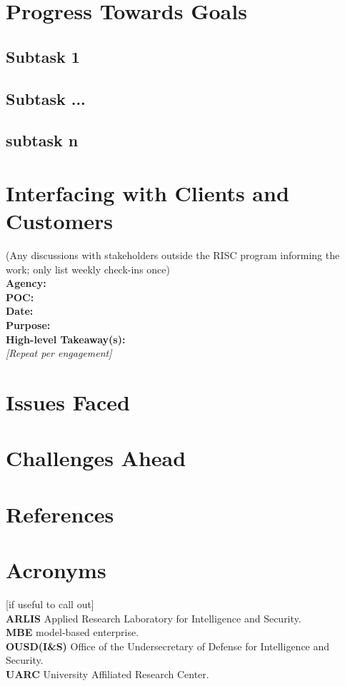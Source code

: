 \documentclass[letterpaper, 10pt]{article}
\begin{document}
\begin{multicols}{2}
    \section{Progress Towards Goals}
        \subsection{Subtask 1}
            \lipsum[5]
        \subsection{Subtask ...}
            \lipsum[6]
        \subsection{subtask n}
            \lipsum[7]
    \section{Interfacing with Clients and Customers}
        (Any discussions with stakeholders outside the RISC  program informing the work; only list weekly check-ins  once) \\
        \textbf{Agency:} \\  
        \textbf{POC:}  \\
        \textbf{Date:} \\
        \textbf{Purpose:} \\
        \textbf{High-level Takeaway(s):} \\ 
        \textit{[Repeat per engagement]} 

    \section{Issues Faced}
        \lipsum[8]
    \section{Challenges Ahead}
        \lipsum[9]
    \section{References}
         
        
    \section{Acronyms}
        [if useful to call out] \\
        \textbf{ARLIS} Applied Research Laboratory for Intelligence and Security.\\ 
        \textbf{MBE} model-based enterprise. \\
        \textbf{OUSD(I\&S)} Office of the Undersecretary of Defense for  Intelligence and Security. \\
        \textbf{UARC} University Affiliated Research Center.\\
\end{multicols}
\end{document}
